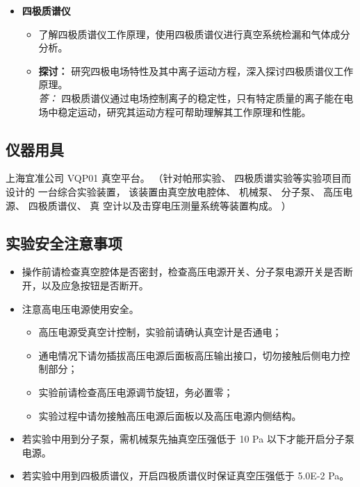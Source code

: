 \documentclass[dvipsnames, svgnames,a4paper,11pt]{article}
\begin{document}
\begin{itemize}
    \item \textbf{四极质谱仪}
    \begin{itemize}
        \item 了解四极质谱仪工作原理，使用四极质谱仪进行真空系统检漏和气体成分分析。
        
        \item \textbf{探讨：} 研究四极电场特性及其中离子运动方程，深入探讨四极质谱仪工作原理。\\
        \textit{答：} 四极质谱仪通过电场控制离子的稳定性，只有特定质量的离子能在电场中稳定运动，研究其运动方程可帮助理解其工作原理和性能。
    \end{itemize}
\end{itemize}


\subsection{仪器用具}
上海宜准公司 VQP01 真空平台。 （针对帕邢实验、 四极质谱实验等实验项目而设计的
一台综合实验装置， 该装置由真空放电腔体、 机械泵、 分子泵、 高压电源、 四极质谱仪、 真
空计以及击穿电压测量系统等装置构成。 ）

\subsection{ 实验安全注意事项}

\begin{itemize}
    \item 操作前请检查真空腔体是否密封，检查高压电源开关、分子泵电源开关是否断开，以及应急按钮是否断开。
    
    \item 注意高电压电源使用安全。 
    \begin{itemize}
        \item 高压电源受真空计控制，实验前请确认真空计是否通电；
        \item 通电情况下请勿插拔高压电源后面板高压输出接口，切勿接触后侧电力控制部分；
        \item 实验前请检查高压电源调节旋钮，务必置零；
        \item 实验过程中请勿接触高压电源后面板以及高压电源内侧结构。
    \end{itemize}
    
    \item 若实验中用到分子泵，需机械泵先抽真空压强低于 10 Pa 以下才能开启分子泵电源。
    
    \item 若实验中用到四极质谱仪，开启四极质谱仪时保证真空压强低于 5.0E-2 Pa。
\end{itemize}
\end{document}
